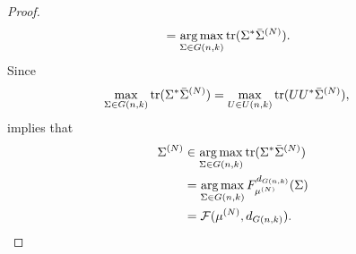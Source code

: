 \documentclass{book}
\begin{document}
\begin{proof}
\begin{align*}
			& = \operatorname*{arg\,max}_{\Sigma \in G(n,k)} \operatorname{\text{tr}}(\Sigma^*\bar{\Sigma}^{(N)}).
		\end{align*}
		Since 
		\begin{align*}
			\max_{\Sigma \in G(n,k)} \operatorname{\text{tr}}(\Sigma^*\bar{\Sigma}^{(N)})
			& = \max_{U \in U(n,k)} \operatorname{\text{tr}}(UU^*\bar{\Sigma}^{(N)}),
		\end{align*}
		 implies that 
		\begin{align*}
			\Sigma^{(N)} 
			& \in \operatorname*{arg\,max}_{\Sigma \in G(n,k)} \operatorname{\text{tr}}(\Sigma^*\bar{\Sigma}^{(N)}) \\
			& = \operatorname*{arg\,max}_{\Sigma \in G(n,k)} F^{d_{G(n,k)}}_{\mu^{(N)}}(\Sigma) \\
			& = \mathcal{F}(\mu^{(N)}, d_{G(n,k)}).
		\end{align*}
	\end{proof}

	

	
\end{document}

